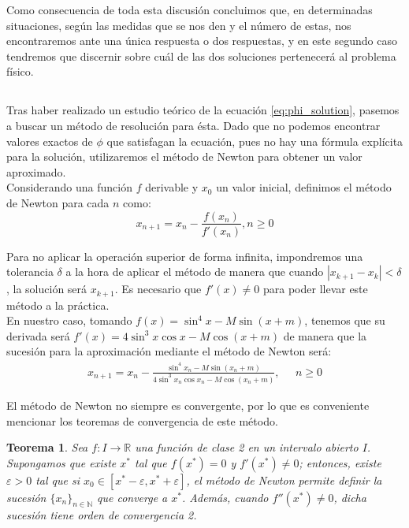 \documentclass[11pt]{article}
\newtheorem{theorem}{Teorema}
\newcommand\ddfrac[2]{\frac{\displaystyle #1}{\displaystyle #2}}
\begin{document}
Como consecuencia de toda esta discusión concluimos que, en determinadas situaciones, según las medidas que se nos den y el número de estas, nos encontraremos ante una única respuesta o dos respuestas, y en este segundo caso tendremos que discernir sobre cuál de las dos soluciones pertenecerá al problema físico.\\


\subsection{}
\label{subsec:newton_rhapson}
Tras haber realizado un estudio teórico de la ecuación \eqref{eq:phi_solution}, pasemos a buscar un método de resolución para ésta. Dado que no podemos encontrar valores exactos de $\phi$ que satisfagan la ecuación, pues no hay una fórmula explícita para la solución, utilizaremos el método de Newton para obtener un valor aproximado.\\

Considerando una función $f$ derivable y $x_0$ un valor inicial, definimos el método de Newton para cada $n$ como:
\[
x_{n+1}=x_n-\ddfrac{f(x_n)}{f'(x_n)}, n\geq0
\]

Para no aplicar la operación superior de forma infinita, impondremos una tolerancia $\delta$ a la hora de aplicar el método de manera que cuando $|x_{k+1}-x_k|<\delta$, la solución será $x_{k+1}$. Es necesario que $f'(x)\neq0$ para poder llevar este método a la práctica.\\

En nuestro caso, tomando $f(x)=\sin^4{x}-M\sin{(x+m)}$, tenemos que su derivada será $f'(x)=4\sin^3{x}\cos{x}-M\cos{(x+m)}$ de manera que la sucesión para la aproximación mediante el método de Newton será:
\begin{align}
x_{n+1}=x_n-\ddfrac{\sin^4{x_n}-M\sin{(x_n+m)}}{4\sin^3{x_n}\cos{x_n}-M\cos{(x_n+m)}}, \; \; \; \; \; n\geq0
\label{eq:phi_newton}
\end{align}

El método de Newton no siempre es convergente, por lo que es conveniente mencionar los teoremas de convergencia de este método. 
\begin{theorem}
\label{theo:convergence_newton}
Sea $f:I\rightarrow\mathbb{R}$ una función de clase 2 en un intervalo abierto $I$. Supongamos que existe $x^*$ tal que $f(x^*)=0$ y $f'(x^*)\neq0$; entonces, existe $\varepsilon>0$ tal que si $x_0\in[x^*-\varepsilon,x^*+\varepsilon]$, el método de Newton permite definir la sucesión $\{x_n\}_{n\in\mathbb{N}}$ que converge a $x^*$. Además, cuando $f''(x^*)\neq0$, dicha sucesión tiene orden de convergencia 2.\\
\end{theorem}
\end{document}

